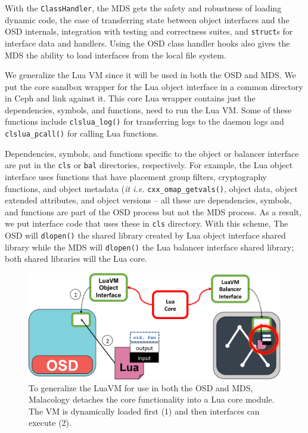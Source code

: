 \documentclass[10pt,twocolumn]{article}
\begin{document}
With the \texttt{ClassHandler}, the MDS gets the safety and robustness
of loading dynamic code, the ease of transferring state between object
interfaces and the OSD internals, integration with testing and
correctness suites, and \texttt{struct}s for interface data and
handlers. Using the OSD class handler hooks also gives the MDS the
ability to load interfaces from the local file system.

We generalize the Lua VM since it will be used in both the OSD and MDS.
We put the core sandbox wrapper for the Lua object interface in a common
directory in Ceph and link against it. This core Lua wrapper contains
just the dependencies, symbols, and functions, need to run the Lua VM.
Some of these functions include \texttt{clslua\_log()} for transferring
logs to the daemon logs and \texttt{clslua\_pcall()} for calling Lua
functions.

Dependencies, symbols, and functions specific to the object or balancer
interface are put in the \texttt{cls} or \texttt{bal} directories,
respectively. For example, the Lua object interface uses functions that
have placement group filters, cryptography functions, and object
metadata (\emph{it i.e.} \texttt{cxx\_omap\_getvals()}, object data,
object extended attributes, and object versions -- all these are
dependencies, symbols, and functions are part of the OSD process but not
the MDS process. As a result, we put interface code that uses these in
\texttt{cls} directory. With this scheme, The OSD will \texttt{dlopen()}
the shared library created by Lua object interface shared library while
the MDS will \texttt{dlopen()} the Lua balancer interface shared
library; both shared libraries will the Lua core.

\begin{figure}[htbp]
\centering
\includegraphics{figures/cls-osd-mds.png}
\caption{To generalize the LuaVM for use in both the OSD and MDS,
Malacology detaches the core functionality into a Lua core module. The
VM is dynamically loaded first (1) and then interfaces can execute (2).
\label{fig:cls-osd-mds}}
\end{figure}
\end{document}
